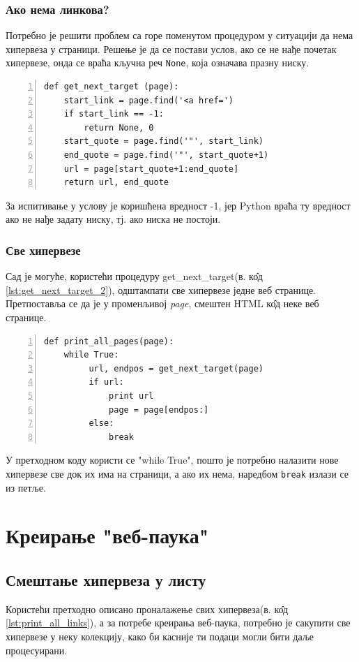 \documentclass[11pt, serbianc, english, titlepage]{article}
\begin{document}
		\subsubsection{Ако нема линкова?}
		Потребно је решити проблем са горе поменутом процедуром у ситуацији да нема хипервеза у страници. Решење је да се постави услов, ако се не нађе почетак хипервезе, онда се враћа кључна реч \lstinline{None}, која означава празну ниску. 
		\begin{lstlisting}[caption = Испитивање да ли страница садржи хипервезу, label={lst:get_next_target_2}, numbers = left]
def get_next_target (page):
    start_link = page.find('<a href=')
    if start_link == -1:
        return None, 0
    start_quote = page.find('"', start_link)
    end_quote = page.find('"', start_quote+1)
    url = page[start_quote+1:end_quote]
    return url, end_quote
		\end{lstlisting}
		За испитивање у услову је коришћена вредност -1, јер Python враћа ту вредност ако не нађе задату ниску, тј. ако ниска не постоји.
		\subsubsection{Све хипервезе}
		Сад је могуће, користећи процедуру get\_next\_target(в. к\^{о}д \ref{lst:get_next_target_2}), одштампати све хипервезе једне веб странице. Претпоставља се да је у променљивој \emph{page}, смештен HTML к\^{о}д неке веб странице.
		\begin{lstlisting}[caption=Процедура штампања свих хипервеза, label={lst:print_all_links}, numbers = left	]
def print_all_pages(page):
    while True:
         url, endpos = get_next_target(page)
         if url:
             print url
             page = page[endpos:]
         else:
             break
		\end{lstlisting}
        У претходном коду користи се "while True", пошто је потребно налазити нове хипервезе све док их има на страници, а ако их нема, наредбом \lstinline{break} излази се из петље.
    \section{Креирање "веб-паука"}    
	\subsection{Смештање хипервеза у листу}
	Користећи претходно описано проналажење свих хипервеза(в. к\^{о}д \ref{lst:print_all_links}), а за потребе креирања веб-паука, потребно је сакупити све хипервезе у неку колекцију, како би касније ти подаци могли бити даље процесуирани. \\
	
\end{document}
